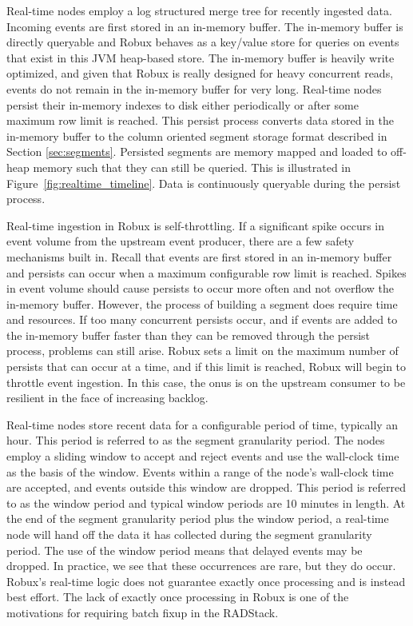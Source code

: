 \documentclass{vldb}
\begin{document}
Real-time nodes employ a log structured merge tree\cite{o1996log} for recently
ingested data. Incoming events are first stored in an in-memory buffer. The
in-memory buffer is directly queryable and Robux behaves as a key/value store for
queries on events that exist in this JVM heap-based store. The in-memory buffer
is heavily write optimized, and given that Robux is really designed for heavy
concurrent reads, events do not remain in the in-memory buffer for very long.
Real-time nodes persist their in-memory indexes to disk either periodically or
after some maximum row limit is reached. This persist process converts data
stored in the in-memory buffer to the column oriented segment storage format
described in Section \ref{sec:segments}.  Persisted segments are memory mapped
and loaded to off-heap memory such that they can still be queried. This is
illustrated in Figure~\ref{fig:realtime_timeline}. Data is continuously
queryable during the persist process.

Real-time ingestion in Robux is self-throttling. If a significant spike occurs
in event volume from the upstream event producer, there are
a few safety mechanisms built in. Recall that events are first stored in an
in-memory buffer and persists can occur when a maximum configurable row limit
is reached. Spikes in event volume should cause persists to occur more often
and not overflow the in-memory buffer. However, the process of building a
segment does require time and resources. If too many concurrent persists occur,
and if events are added to the in-memory buffer faster than they can be removed
through the persist process, problems can still arise. Robux sets a limit on
the maximum number of persists that can occur at a time, and if this limit is
reached, Robux will begin to throttle event ingestion. In this case, the onus
is on the upstream consumer to be resilient in the face of increasing backlog.

Real-time nodes store recent data for a configurable period of time, typically
an hour. This period is referred to as the segment granularity period. The
nodes employ a sliding window to accept and reject events and use the
wall-clock time as the basis of the window. Events within a range of the node’s
wall-clock time are accepted, and events outside this window are dropped. This
period is referred to as the window period and typical window periods are 10
minutes in length. At the end of the segment granularity period plus the window
period, a real-time node will hand off the data it has collected during the
segment granularity period. The use of the window period means that delayed
events may be dropped. In practice, we see that these occurrences are rare, but
they do occur. Robux's real-time logic does not guarantee exactly once
processing and is instead best effort. The lack of exactly once processing in
Robux is one of the motivations for requiring batch fixup in the RADStack.
\end{document}
